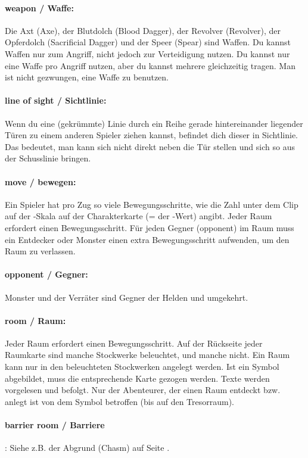 \paragraph{weapon / Waffe:} Die Axt (Axe), der Blutdolch (Blood Dagger), der Revolver (Revolver), der Opferdolch (Sacrificial Dagger) und der Speer (Spear) sind Waffen. Du kannst Waffen nur zum Angriff, nicht jedoch zur Verteidigung nutzen. Du kannst nur eine Waffe pro Angriff nutzen, aber du kannst mehrere gleichzeitig tragen. Man ist nicht gezwungen, eine Waffe zu benutzen.

\paragraph{line of sight / Sichtlinie:} Wenn du eine (gekrümmte) Linie durch ein Reihe gerade hintereinander liegender Türen zu einem anderen Spieler ziehen kannst, befindet dich dieser in Sichtlinie. Das bedeutet, man kann sich nicht direkt neben die Tür stellen und sich so aus der Schusslinie bringen.

\paragraph{move / bewegen:} Ein Spieler hat pro Zug so viele Bewegungsschritte, wie die Zahl unter dem Clip auf der \speed-Skala auf der Charakterkarte (= der \speed-Wert) angibt. Jeder Raum erfordert einen Bewegungsschritt. Für jeden Gegner (opponent) im Raum muss ein Entdecker oder Monster einen extra Bewegungsschritt aufwenden, um den Raum zu verlassen.

\paragraph{opponent / Gegner:} Monster und der Verräter sind Gegner der Helden und umgekehrt.

\paragraph{room / Raum:} Jeder Raum erfordert einen Bewegungsschritt. Auf der Rückseite jeder Raumkarte sind manche Stockwerke beleuchtet, und manche nicht. Ein Raum kann nur in den beleuchteten Stockwerken angelegt werden. Ist ein Symbol abgebildet, muss die entsprechende Karte gezogen werden. Texte werden vorgelesen und befolgt. Nur der Abenteurer, der einen Raum entdeckt bzw. anlegt ist von dem Symbol betroffen (bis auf den Tresorraum).

\paragraph{barrier room / Barriere}: Siehe z.B. der Abgrund (Chasm) auf Seite \pageref{kap:rules:specialrooms}.

